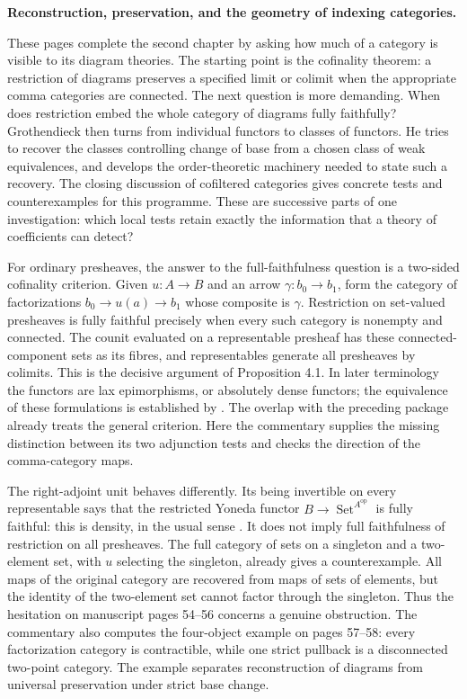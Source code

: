 \begingroup
{}
\noindent\textbf{Reconstruction, preservation, and the geometry of indexing categories.}

These pages complete the second chapter by asking how much of a category is
visible to its diagram theories. The starting point is the cofinality theorem:
a restriction of diagrams preserves a specified limit or colimit when the
appropriate comma categories are connected. The next question is more demanding.
When does restriction embed the whole category of diagrams fully faithfully?
Grothendieck then turns from individual functors to classes of functors. He
tries to recover the classes controlling change of base from a chosen class
of weak equivalences, and develops the order-theoretic machinery needed to
state such a recovery. The closing discussion of cofiltered categories gives
concrete tests and counterexamples for this programme. These are successive
parts of one investigation: which local tests retain exactly the information
that a theory of coefficients can detect?

For ordinary presheaves, the answer to the full-faithfulness question is a
two-sided cofinality criterion. Given $u:A\to B$ and an arrow
$\gamma:b_0\to b_1$, form the category of factorizations
$b_0\to u(a)\to b_1$ whose composite is $\gamma$. Restriction on
set-valued presheaves is fully faithful precisely when every such category
is nonempty and connected. The counit evaluated on a representable presheaf
has these connected-component sets as its fibres, and representables generate
all presheaves by colimits. This is the decisive argument of Proposition 4.1.
In later terminology the functors are lax epimorphisms, or absolutely dense
functors; the equivalence of these formulations is established by
\citet{AdamekElBashirSobralVelebil2001}. The overlap with the preceding package
already treats the general criterion. Here the commentary supplies the
missing distinction between its two adjunction tests and checks the direction
of the comma-category maps.

The right-adjoint unit behaves differently. Its being invertible on every
representable says that the restricted Yoneda functor
$B\to\operatorname{Set}^{A^{\mathrm{op}}}$ is fully faithful: this is
density, in the usual sense \citep[Definition 6.5.11]{Riehl2016}. It does not
imply full faithfulness of restriction on all presheaves. The full category
of sets on a singleton and a two-element set, with $u$ selecting the
singleton, already gives a counterexample. All maps of the original category
are recovered from maps of sets of elements, but the identity of the
two-element set cannot factor through the singleton. Thus the hesitation on
manuscript pages 54--56 concerns a genuine obstruction. The commentary also
computes the four-object example on pages 57--58: every factorization
category is contractible, while one strict pullback is a disconnected
two-point category. The example separates reconstruction of diagrams from
universal preservation under strict base change.

